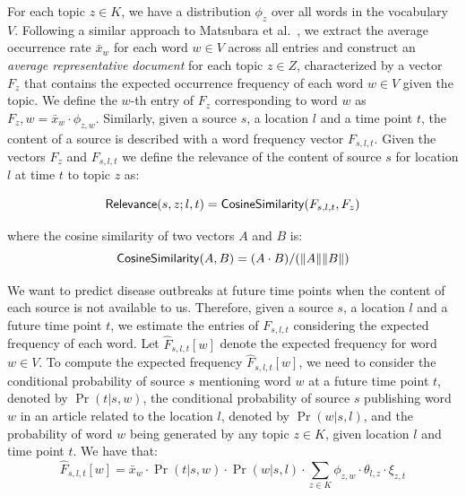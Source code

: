 \documentclass[twoside,leqno,twocolumn]{article}
\begin{document}
For each topic $z \in K$, we have a distribution $\phi_z$ over all words in the vocabulary $V$. Following a similar approach to Matsubara et al.~\cite{matsubara:2012}, we extract the average occurrence rate $\bar{x}_w$ for each word $w \in V$ across all entries and construct an {\em average representative document} for each topic $z \in Z$, characterized by a vector $F_z$ that contains the expected occurrence frequency of each word $w \in V$ given the topic. We define the $w$-th entry of $F_z$ corresponding to word $w$ as $F_z,w = \bar{x}_w \cdot \phi_{z,w}$. Similarly, given a source $s$,  a location $l$ and a time point $t$, the content of a source is described with a word frequency vector $F_{s,l,t}$. Given the vectors $F_z$ and $F_{s,l,t}$ we define the relevance of the content of source $s$ for location $l$ at time $t$ to topic $z$ as:

{\small \begin{equation}
{\sf Relevance}(s,z;l,t) = {\sf CosineSimilarity}(F_{s,l,t},F_z)
\end{equation}}\vspace{-10pt}

where the cosine similarity of two vectors $A$ and $B$ is:
{\small \begin{equation}
{\sf CosineSimilarity}(A,B) = (A \cdot B)/(\|A\| \|B\|)
\end{equation}}
\vspace{-10pt}
 
We want to predict disease outbreaks at future time points when the content of each source is not available to us. Therefore, given a source $s$, a location $l$ and a future time point $t$, we estimate the entries of $F_{s,l,t}$ considering the expected frequency of each word. Let $\hat{F}_{s,l,t}[w]$ denote the expected frequency for word 
$w \in V$. To compute the expected frequency $\hat{F}_{s,l,t}[w]$, we need to consider the conditional probability of source $s$ mentioning word $w$ at a future time point $t$, denoted by $\Pr(t|s,w)$, the conditional probability of source $s$ publishing word $w$ in an article related to the location $l$, denoted by $\Pr(w|s,l)$, and 
the probability of word $w$ being generated by any topic $z \in K$, given location $l$ and time point $t$. 
We have that:
{\small \begin{equation}
  \hat{F}_{s,l,t}[w] = \bar{x}_{w} \cdot \Pr(t|s,w) \cdot \Pr(w|s,l)\cdot \sum_{z \in K}\phi_{z,w}\cdot \theta_{l,z} \cdot \xi_{z,t}
\end{equation}}
\vspace{-10pt}
\end{document}

